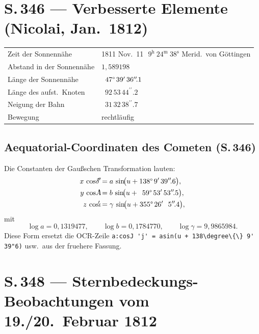 \documentclass[11pt,a4paper]{article}
\newcommand{\h}{^{\mathrm{h}}}
\newcommand{\m}{^{\mathrm{m}}}
\newcommand{\s}{^{\mathrm{s}}}
\newcommand{\arcmin}{^{\prime}}
\newcommand{\arcsecdec}[1]{^{\prime\prime}\!.#1}   %
\begin{document}
\section*{S.\,346 --- Verbesserte Elemente (Nicolai, Jan.\ 1812)}

\begin{center}
\begin{tabular}{l l}
\toprule
Zeit der Sonnenn\"ahe         & 1811 Nov.\ 11\ $\,9\h\ 24\m\ 38\s$ Merid.\ von G\"ottingen\\
Abstand in der Sonnenn\"ahe  & $1{,}589198$\\
L\"ange der Sonnenn\"ahe      & $\phantom{0}47\degree\,39\arcmin\,36\arcsecdec{1}$\\
L\"ange des aufst.\ Knoten   & $\phantom{0}92\,53\,44\arcsecdec{2}$\\
Neigung der Bahn             & $\phantom{0}31\,32\,38\arcsecdec{7}$\\
Bewegung                     & rechtl\"aufig\\
\bottomrule
\end{tabular}
\end{center}

\subsection*{Aequatorial-Coordinaten des Cometen (S.\,346)}
\noindent
Die Constanten der Gau\ss schen Transformation lauten:
\begin{align*}
x\,\cos\!\delta'\!^{\!\!\prime}      &= a\,\sin\!\bigl(u+138\degree\, 9\arcmin\,39\arcsecdec{6}\bigr),\\
y\,\cos\!A\!^{\!\!\prime}            &= b\,\sin\!\bigl(u+\phantom{0}59\degree\,53\arcmin\,53\arcsecdec{5}\bigr),\\
z\,\cos\!\iota\!^{\!\!\prime}        &= \gamma\,\sin\!\bigl(u+355\degree\,26\arcmin\,\phantom{0}5\arcsecdec{4}\bigr),
\end{align*}
mit
\[
\log a = 0{,}1319477,\qquad
\log b = 0{,}1784770,\qquad
\log \gamma = 9{,}9865984.
\]
Diese Form ersetzt die OCR-Zeile
\verb|a:cosJ 'j' = asin(u + 138\degree\{\} 9' 39"6)| usw.\ aus der fruehere Fassung.

\section*{S.\,348 --- Sternbedeckungs-Beobachtungen vom 19./20.~Februar 1812}
\end{document}
